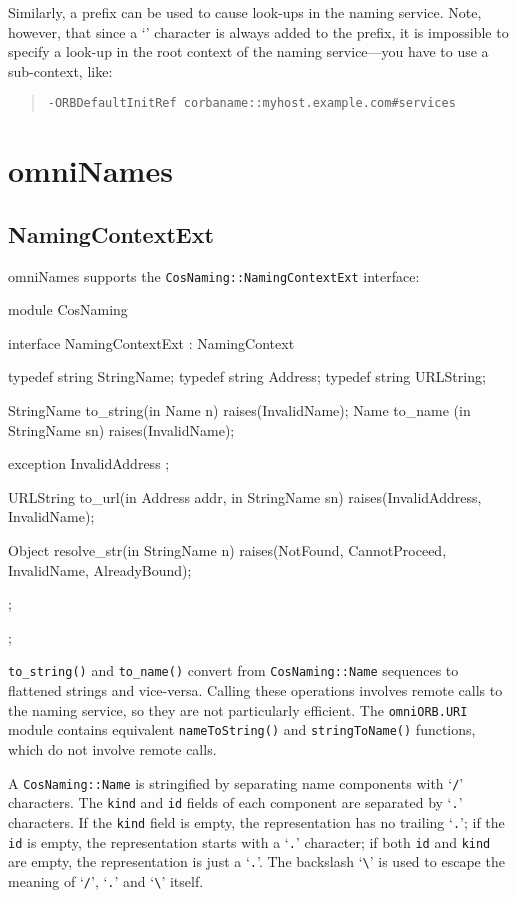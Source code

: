 \documentclass[draft,11pt,twoside,a4paper]{book}
\newcommand{\type}[1]{\texttt{#1}}
\newcommand{\intf}[1]{\texttt{#1}}
\newcommand{\module}[1]{\texttt{#1}}
\newcommand{\code}[1]{\texttt{#1}}
\newcommand{\op}[1]{\texttt{#1()}}
\newcommand{\cmdline}[1]{\texttt{#1}}
\newcommand{\corbauri}{\begingroup \urlstyle{tt}\Url}
\begin{document}
Similarly, a \corbauri{corbaname} prefix can be used to cause
look-ups in the naming service. Note, however, that since a
`\corbauri{/}' character is always added to the prefix, it is
impossible to specify a look-up in the root context of the naming
service---you have to use a sub-context, like:

\begin{quote}
\cmdline{-ORBDefaultInitRef corbaname::myhost.example.com\#services}
\end{quote}



\section{omniNames}

\subsection{NamingContextExt}

omniNames supports the \intf{CosNaming::NamingContextExt} interface:

\begin{idllisting}
module CosNaming {
  interface NamingContextExt : NamingContext {
    typedef string StringName;
    typedef string Address;
    typedef string URLString;

    StringName  to_string(in Name n)        raises(InvalidName);
    Name        to_name  (in StringName sn) raises(InvalidName);

    exception InvalidAddress {};

    URLString   to_url(in Address addr, in StringName sn)
      raises(InvalidAddress, InvalidName);

    Object      resolve_str(in StringName n)
      raises(NotFound, CannotProceed, InvalidName, AlreadyBound);
  };
};
\end{idllisting}

\op{to\_string} and \op{to\_name} convert from \type{CosNaming::Name}
sequences to flattened strings and vice-versa.  Calling these
operations involves remote calls to the naming service, so they are
not particularly efficient. The \module{omniORB.URI} module contains
equivalent \op{nameToString} and \op{stringToName} functions, which do
not involve remote calls.

A \type{CosNaming::Name} is stringified by separating name components
with `\texttt{/}' characters. The \code{kind} and \code{id} fields of
each component are separated by `\texttt{.}' characters. If the
\code{kind} field is empty, the representation has no trailing
`\texttt{.}'; if the \code{id} is empty, the representation starts
with a `\texttt{.}' character; if both \texttt{id} and \texttt{kind}
are empty, the representation is just a `\texttt{.}'. The backslash
`\texttt{\textbackslash}' is used to escape the meaning of
`\texttt{/}', `\texttt{.}' and `\texttt{\textbackslash}' itself.
\end{document}
